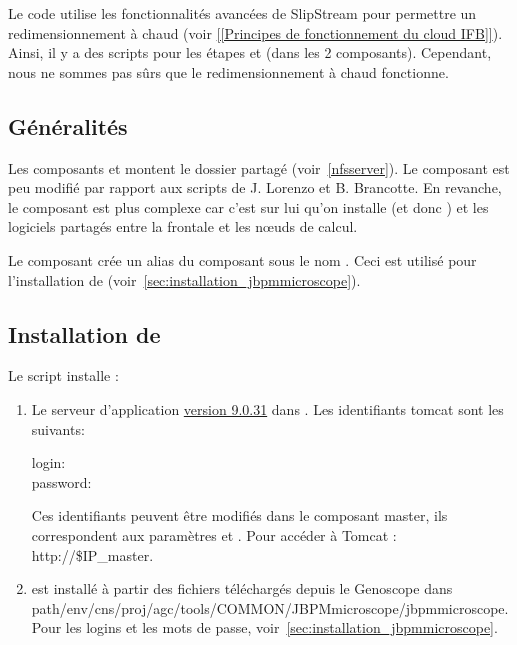 Le code utilise les fonctionnalités avancées de SlipStream pour permettre un redimensionnement à chaud
(voir \href{https://intranet.genoscope.cns.fr/agc/redmine/projects/microcloud/wiki/Principes_de_fonctionnement_du_cloud_IFB}{[[Principes de fonctionnement du cloud IFB]]}).
Ainsi, il y a des scripts pour les étapes  et  (dans les 2 composants).
Cependant, nous ne sommes pas sûrs que le redimensionnement à chaud fonctionne.

\subsection{Généralités}

Les composants  et  montent le dossier partagé  (voir~\autoref{nfsserver}).
Le composant  est peu modifié par rapport aux scripts de J. Lorenzo et B. Brancotte.
En revanche, le composant  est plus complexe car
c'est sur lui qu'on installe  (et donc )
et les logiciels partagés entre la frontale et les nœuds de calcul.

Le composant  crée un alias du composant  sous le nom .
Ceci est utilisé pour l'installation de  (voir~\autoref{sec:installation_jbpmmicroscope}).

\subsection{Installation de }

Le script  installe :
\begin{enumerate}
    \item Le serveur d'application \href{http://mirrors.ircam.fr/pub/apache/tomcat/tomcat-9/v9.0.31/bin/apache-tomcat-9.0.31.tar.gz}{ version 9.0.31} dans .
    Les identifiants tomcat sont les suivants:
    \begin{description}
        \item[login:] 
        \item[password:] 
    \end{description}
    Ces identifiants peuvent être modifiés dans le composant master, ils correspondent aux paramètres  et .
    Pour accéder à Tomcat : http://\$IP\_master.

    \item {} est installé à partir des fichiers téléchargés depuis le Genoscope
    dans path{/env/cns/proj/agc/tools/COMMON/JBPMmicroscope/jbpmmicroscope}.
    Pour les logins et les mots de passe, voir~\autoref{sec:installation_jbpmmicroscope}.
\end{enumerate}

